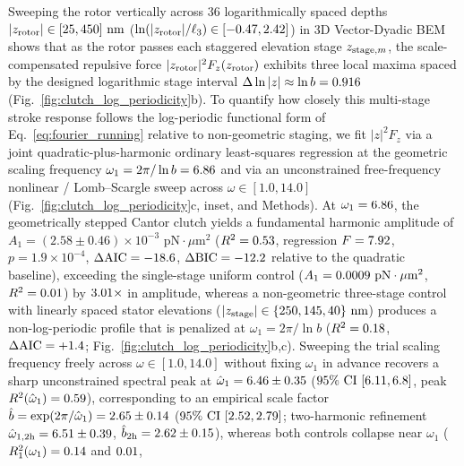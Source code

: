 \documentclass[pdflatex,sn-nature]{sn-jnl}
\DeclareRobustCommand{\roundone}[1]{\fpeval{round(#1,1)}}
\DeclareRobustCommand{\roundtwo}[1]{\fpeval{round(#1,2)}}
\DeclareRobustCommand{\roundthree}[1]{\fpeval{round(#1,3)}}
\DeclareRobustCommand{\roundfour}[1]{\fpeval{round(#1,4)}}
\begin{document}
Sweeping the rotor vertically across $36$ logarithmically spaced depths $|z_{\rm rotor}| \in [25, 450]\text{ nm}$ ($\ln(|z_{\rm rotor}|/\ell_3) \in [-0.47, 2.42]$) in 3D Vector-Dyadic BEM shows that as the rotor passes each staggered elevation stage $z_{{\rm stage},m}$, the scale-compensated repulsive force $|z_{\rm rotor}|^2 F_z(z_{\rm rotor})$ exhibits three local maxima spaced by the designed logarithmic stage interval $\Delta\ln|z| \approx \ln b = \roundthree{\LogperSteppedRzLnB}$ (Fig.~\ref{fig:clutch_log_periodicity}b). To quantify how closely this multi-stage stroke response follows the log-periodic functional form of Eq.~\eqref{eq:fourier_running} relative to non-geometric staging, we fit $|z|^2 F_z$ via a joint quadratic-plus-harmonic ordinary least-squares regression at the geometric scaling frequency $\omega_1 = 2\pi/\ln b = \roundtwo{\LogperSteppedRzOmegaone}$ and via an unconstrained free-frequency nonlinear / Lomb--Scargle sweep across $\omega \in [1.0, 14.0]$ (Fig.~\ref{fig:clutch_log_periodicity}c, inset, and Methods). At $\omega_1 = \roundtwo{\LogperSteppedRzOmegaone}$, the geometrically stepped Cantor clutch yields a fundamental harmonic amplitude of $A_1 = (2.58 \pm 0.46) \times 10^{-3}\text{ pN}\cdot\mu\text{m}^2$ ($R^2 = \roundtwo{\LogperSteppedRzRtwo}$, regression $F = \roundtwo{\LogperSteppedRzFstatCantor}$, $p = 1.9 \times 10^{-4}$, $\Delta\mathrm{AIC} = \roundone{\LogperSteppedRzDeltaAicCantor}$, $\Delta\mathrm{BIC} = \roundone{\LogperSteppedRzDeltaBicCantor}$ relative to the quadratic baseline), exceeding the single-stage uniform control ($A_1 = \roundfour{\LogperSteppedRzAmponeUniform}\text{ pN}\cdot\mu\text{m}^2$, $R^2 = \roundtwo{\LogperSteppedRzRtwoUniform}$) by $\roundtwo{\LogperSteppedRzAmponeRatio}\times$ in amplitude, whereas a non-geometric three-stage control with linearly spaced stator elevations ($|z_{\rm stage}| \in \{250, 145, 40\}\text{ nm}$) produces a non-log-periodic profile that is penalized at $\omega_1 = 2\pi/\ln b$ ($R^2 = \roundtwo{\LogperSteppedRzRtwoLinear}$, $\Delta\mathrm{AIC} = +\roundone{\LogperSteppedRzDeltaAicLinear}$; Fig.~\ref{fig:clutch_log_periodicity}b,c). Sweeping the trial scaling frequency freely across $\omega \in [1.0, 14.0]$ without fixing $\omega_1$ in advance recovers a sharp unconstrained spectral peak at $\hat{\omega}_1 = \roundtwo{\LogperFreeOmegaoneCantor} \pm \roundtwo{\LogperFreeOmegaoneCininefiveHalfCantor}$ ($95\%\text{ CI } [\roundtwo{\LogperFreeOmegaoneCininefiveLowCantor}, \roundtwo{\LogperFreeOmegaoneCininefiveHighCantor}]$, peak $R^2(\hat{\omega}_1) = \roundtwo{\LogperFreeRtwoPeakCantor}$), corresponding to an empirical scale factor $\hat{b} = \exp(2\pi/\hat{\omega}_1) = \roundtwo{\LogperFreeBHatCantor} \pm \roundtwo{\LogperFreeBHatCininefiveHalfCantor}$ ($95\%\text{ CI } [\roundtwo{\LogperFreeBHatCininefiveLowCantor}, \roundtwo{\LogperFreeBHatCininefiveHighCantor}]$; two-harmonic refinement $\hat{\omega}_{1,\rm 2h} = \roundtwo{\LogperFreeOmegaoneTwohCantor} \pm \roundtwo{\LogperFreeOmegaoneTwohCininefiveHalfCantor}$, $\hat{b}_{\rm 2h} = \roundtwo{\LogperFreeBHatTwohCantor} \pm \roundtwo{\LogperFreeBHatTwohCininefiveHalfCantor}$), whereas both controls collapse near $\omega_1$ ($R^2_1(\omega_1) = \roundtwo{\LogperFreeRtwoAtOmegaoneLinear}$ and $\roundtwo{\LogperFreeRtwoAtOmegaoneUniform}$, 
\end{document}
